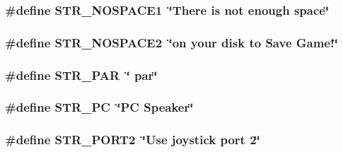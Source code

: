 \label{FOREIGN_8H_afe31e7691d6ff56f21f4762bf899af2d}
\hypertarget{FOREIGN_8H_af334155c31cf5b7d532a83b8b92a7abf}{
\subsubsection[{STR\_\-NOSPACE1}]{\setlength{\rightskip}{0pt plus 5cm}\#define STR\_\-NOSPACE1~\char`\"{}There is not enough space\char`\"{}}}
\label{FOREIGN_8H_af334155c31cf5b7d532a83b8b92a7abf}
\hypertarget{FOREIGN_8H_a58818798b1f6231d2b7a7a9f1c89c92f}{
\subsubsection[{STR\_\-NOSPACE2}]{\setlength{\rightskip}{0pt plus 5cm}\#define STR\_\-NOSPACE2~\char`\"{}on your disk to Save Game!\char`\"{}}}
\label{FOREIGN_8H_a58818798b1f6231d2b7a7a9f1c89c92f}
\hypertarget{FOREIGN_8H_a7747ee6c3e3a300c85983cdb8861cf98}{
\subsubsection[{STR\_\-PAR}]{\setlength{\rightskip}{0pt plus 5cm}\#define STR\_\-PAR~\char`\"{} par\char`\"{}}}
\label{FOREIGN_8H_a7747ee6c3e3a300c85983cdb8861cf98}
\hypertarget{FOREIGN_8H_a5757f9a98d9b096a82ea673505adec0d}{
\subsubsection[{STR\_\-PC}]{\setlength{\rightskip}{0pt plus 5cm}\#define STR\_\-PC~\char`\"{}PC Speaker\char`\"{}}}
\label{FOREIGN_8H_a5757f9a98d9b096a82ea673505adec0d}
\hypertarget{FOREIGN_8H_a452ce4b896d1cf6206cf60af703eefce}{
\subsubsection[{STR\_\-PORT2}]{\setlength{\rightskip}{0pt plus 5cm}\#define STR\_\-PORT2~\char`\"{}Use joystick port 2\char`\"{}}}
\label{FOREIGN_8H_a452ce4b896d1cf6206cf60af703eefce}
